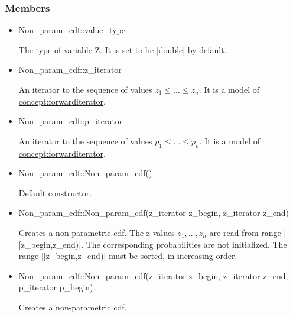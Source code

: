\documentclass[12pt,twoside]{report}
\begin{document}
\htmlrule[CLEAR=all]  \subsubsection*{Members}
\begin{itemize}
\item 
\begin{code}
Non_param_cdf::value_type
\end{code}

The type of variable Z. It is set to be |double| by default.

\item 
\begin{code}
Non_param_cdf::z_iterator
\end{code}

An iterator to the sequence of values $z_1 \le \ldots \le z_n$. It is a model of \hyperref{Forward Iterator}{Forward Iterator (see Section}{)}{concept:forwarditerator}.

\item 
\begin{code}
Non_param_cdf::p_iterator
\end{code}

An iterator to the sequence of values $p_1 \le \ldots \le p_n$. It is a model of \hyperref{Forward Iterator}{Forward Iterator (see Section}{)}{concept:forwarditerator}.


\item 
\begin{code}
Non_param_cdf::Non_param_cdf()
\end{code}

Default constructor.


\item 
\begin{code}
Non_param_cdf::Non_param_cdf(z_iterator z_begin, z_iterator z_end)
\end{code}

Creates a non-parametric cdf. The z-values $z_1,\ldots,z_n$ are read from range |[z_begin,z_end)|. The corresponding probabilities are not initialized. The range |[z_begin,z_end)| must be sorted, in increasing order.

\item
\begin{code}
Non_param_cdf::Non_param_cdf(z_iterator z_begin, z_iterator z_end,
                             p_iterator p_begin)
\end{code}


Creates a non-parametric cdf. 


\end{itemize}
\end{document}
